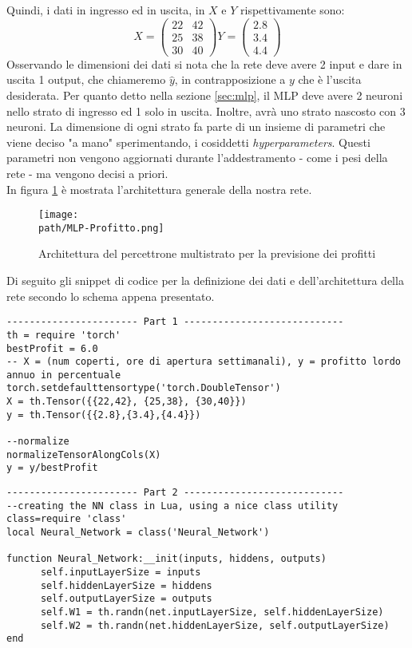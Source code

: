 Quindi, i dati in ingresso ed in uscita, in $X$ e $Y$ rispettivamente sono:
\[
X = \begin{pmatrix}
22 & 42\\
25 & 38 \\
30 & 40
\end{pmatrix}
%
Y = \begin{pmatrix}
2.8\\
3.4 \\
4.4
\end{pmatrix}
\]
Osservando le dimensioni dei dati si nota che la rete deve avere 2 input e dare in uscita 1 output, che chiameremo $\hat{y}$, in contrapposizione a $y$ che è l'uscita desiderata. Per quanto detto nella sezione \ref{sec:mlp}, il MLP deve avere 2 neuroni nello strato di ingresso ed 1 solo in uscita. Inoltre, avrà uno strato nascosto con 3 neuroni. La dimensione di ogni strato fa parte di un insieme di parametri che viene deciso "a mano" sperimentando, i cosiddetti \emph{hyperparameters}. Questi parametri non vengono aggiornati durante l'addestramento - come i pesi della rete - ma vengono decisi a priori. \\In figura \ref{fig:mlp} è mostrata l'architettura generale della nostra rete.

\begin{figure}[h!]
 \centering
 \texttt{[image: \\path/MLP-Profitto.png]}
 \caption{Architettura del percettrone multistrato per la previsione dei profitti}
 \label{fig:mlp}
\end{figure}

Di seguito gli snippet di codice per la definizione dei dati e dell'architettura della rete secondo lo schema appena presentato.

\begin{lstlisting}[language={[5.2]Lua}]
----------------------- Part 1 ----------------------------
th = require 'torch'
bestProfit = 6.0
-- X = (num coperti, ore di apertura settimanali), y = profitto lordo annuo in percentuale
torch.setdefaulttensortype('torch.DoubleTensor')
X = th.Tensor({{22,42}, {25,38}, {30,40}})
y = th.Tensor({{2.8},{3.4},{4.4}})

--normalize
normalizeTensorAlongCols(X)
y = y/bestProfit

\end{lstlisting}

\begin{lstlisting}[language={[5.2]Lua}]
----------------------- Part 2 ----------------------------
--creating the NN class in Lua, using a nice class utility
class=require 'class'
local Neural_Network = class('Neural_Network')

function Neural_Network:__init(inputs, hiddens, outputs)
      self.inputLayerSize = inputs
      self.hiddenLayerSize = hiddens
      self.outputLayerSize = outputs
      self.W1 = th.randn(net.inputLayerSize, self.hiddenLayerSize)
      self.W2 = th.randn(net.hiddenLayerSize, self.outputLayerSize)
end
\end{lstlisting}

